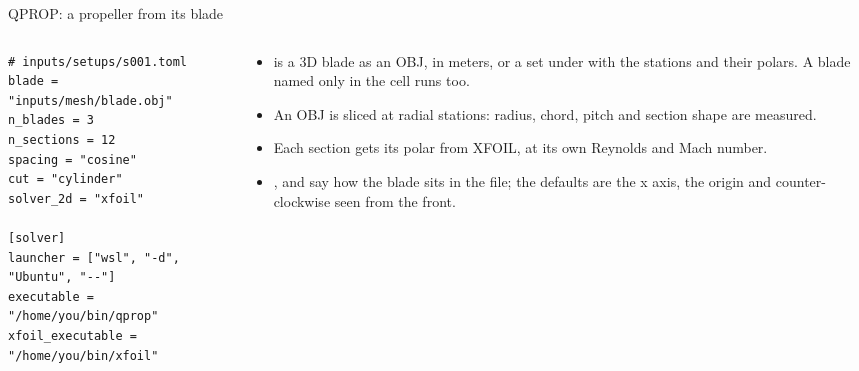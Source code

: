 \begin{frame}[fragile]{QPROP: a propeller from its blade}
\begin{columns}[T]
\begin{column}{0.5\textwidth}
\begin{lstlisting}[style=cfdbtoml]
# inputs/setups/s001.toml
blade = "inputs/mesh/blade.obj"
n_blades = 3
n_sections = 12
spacing = "cosine"
cut = "cylinder"
solver_2d = "xfoil"

[solver]
launcher = ["wsl", "-d", "Ubuntu", "--"]
executable = "/home/you/bin/qprop"
xfoil_executable = "/home/you/bin/xfoil"
\end{lstlisting}
\end{column}
\begin{column}{0.46\textwidth}
\begin{itemize}\small
  \item {} is a 3D blade as an OBJ, in meters, or a set under
         with the stations and their polars. A blade
        named only in the  cell runs too.
  \item An OBJ is sliced at  radial stations: radius,
        chord, pitch and section shape are measured.
  \item Each section gets its polar from XFOIL, at its own Reynolds and
        Mach number.
  \item {},  and  say how the
        blade sits in the file; the defaults are the x axis, the origin and
        counter-clockwise seen from the front.
\end{itemize}
\end{column}
\end{columns}
\end{frame}

